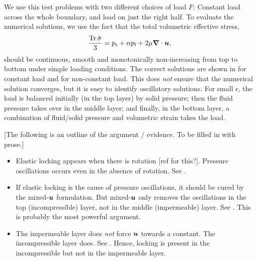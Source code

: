 
We use this test problems with two different choices of load $F$: Constant load
across the whole boundary, and load on just the right half.
To evaluate the numerical solutions, we use the fact that the total volumetric
effective stress,
\begin{equation}
\frac{\trace{\tilde{\sigma}}}{3} = \Ps + \alpha \Pf + 2\mu \nabla\cdot\U,
\end{equation}
should be continuous, smooth and monotonically non-increasing from top to bottom
under simple loading conditions. The correct solutions are shown in
 for constant load and  for
non-constant load.
This does \emph{not} ensure that the numerical solution converges, but it is easy to
identify oscillatory solutions.
For small $\epsilon$, the load is balanced initially (in the top layer) by
solid pressure; then the fluid pressure takes over in the middle layer; and
finally, in the bottom layer, a combination of fluid/solid pressure and
volumetric strain takes the load.


[The following is an outline of the argument / evidence. To be filled in with prose.]
\begin{itemize}
\item Elastic locking appears when there is rotation [ref for this?]. Pressure oscillations
  occurs even in the absence of rotation. See
  .
\item If elastic locking is the cause of pressure oscillations, it should be
  cured by the mixed-$\boldsymbol{u}$ formulation. But mixed-$\boldsymbol{u}$ only removes the
  oscillations in the top (incompressible) layer, not in the middle
  (impermeable) layer. See . This is
  probably the most powerful argument.
\item The impermeable layer does \emph{not} force $\boldsymbol{u}$ towards a constant. The
  incompressible layer does. See . Hence, locking is present
  in the incompressible but not in the impermeable layer.
\end{itemize}

